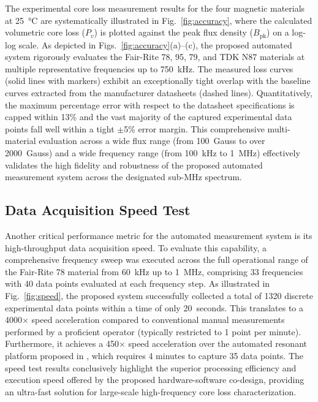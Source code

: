 \documentclass[conference]{IEEEtran}
\begin{document}
The experimental core loss measurement results for the four magnetic materials at \SI{25}{\celsius} are systematically illustrated in Fig.~\ref{fig:accuracy}, where the calculated volumetric core loss ($P_v$) is plotted against the peak flux density ($B_{\text{pk}}$) on a log-log scale. As depicted in Figs.~\ref{fig:accuracy}(a)--(c), the proposed automated system 
rigorously evaluates the Fair-Rite 78, 95, 79, and TDK N87 materials at multiple representative frequencies up to \SI{750}{kHz}. The measured loss curves (solid lines with markers) exhibit an exceptionally tight overlap with the baseline curves extracted from the manufacturer datasheets (dashed lines). Quantitatively, the maximum percentage error with respect to the datasheet specifications is capped within \num{13}\% and the vast majority of the captured experimental data points fall well within a tight $\pm$\num{5}\% error margin. This comprehensive multi-material evaluation across a wide flux range (from \SI{100}{Gauss} to over \SI{2000}{Gauss}) and a wide frequency range (from \SI{100}{kHz} to \SI{1}{MHz}) effectively validates the high fidelity and robustness of the proposed automated measurement system across the designated sub-MHz spectrum.

\subsection{Data Acquisition Speed Test}\label{}

Another critical performance metric for the automated measurement system is its high-throughput data acquisition speed. To evaluate this capability, a comprehensive frequency sweep was executed across the full operational range of the Fair-Rite 78 
material from \SI{60}{kHz} up to \SI{1}{MHz}, comprising \num{33} frequencies with \num{40} data points evaluated at each frequency step. As illustrated in Fig.~\ref{fig:speed}, the proposed system successfully collected a total of \num{1320} discrete experimental data points within a time of only \SI{20}{seconds}. This translates to a \num{4000}$\times$ speed acceleration compared to conventional manual measurements performed by a proficient operator (typically restricted to \num{1} point per minute). Furthermore, it achieves a \num{450}$\times$ speed acceleration over the automated resonant 
platform proposed in \cite{janderson}, which requires \num{4} minutes to capture \num{35} data points. The speed test results conclusively highlight the superior processing efficiency and execution speed offered by the proposed hardware-software 
co-design, providing an ultra-fast solution for large-scale high-frequency core loss characterization.
\end{document}
